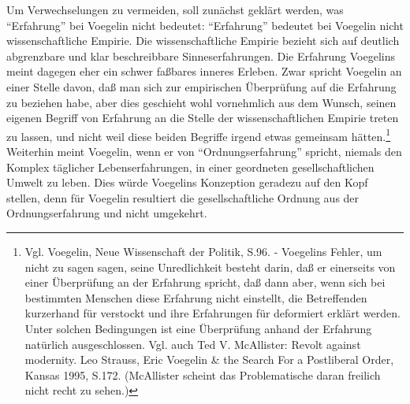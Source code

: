 Um Verwechselungen zu vermeiden, soll zunächst geklärt werden, was
"`Erfahrung"' bei Voegelin nicht bedeutet: "`Erfahrung"' bedeutet bei Voegelin
nicht wissenschaftliche Empirie. Die wissenschaftliche Empirie bezieht sich
auf deutlich abgrenzbare und klar beschreibbare Sinneserfahrungen. Die
Erfahrung Voegelins meint dagegen eher ein schwer faßbares inneres Erleben.
Zwar spricht Voegelin an einer Stelle davon, daß man sich zur empirischen
Überprüfung auf die Erfahrung zu beziehen habe, aber dies geschieht wohl
vornehmlich aus dem Wunsch, seinen eigenen Begriff von Erfahrung an die Stelle
der wissenschaftlichen Empirie treten zu lassen, und nicht weil diese beiden
Begriffe irgend etwas gemeinsam hätten.\footnote{Vgl. Voegelin, Neue
  Wissenschaft der Politik, S.96. - Voegelins Fehler, um nicht zu sagen sagen,
  seine Unredlichkeit besteht darin, daß er einerseits von einer Überprüfung
  an der Erfahrung spricht, daß dann aber, wenn sich bei bestimmten Menschen
  diese Erfahrung nicht einstellt, die Betreffenden kurzerhand für verstockt
  und ihre Erfahrungen für deformiert erklärt werden. Unter solchen Bedingungen
  ist eine Überprüfung anhand der Erfahrung natürlich ausgeschlossen. Vgl.
  auch Ted V. McAllister: Revolt against modernity. Leo Strauss, Eric Voegelin
  \& the Search For a Postliberal Order, Kansas 1995, S.172. (McAllister
  scheint das Problematische daran freilich nicht recht zu sehen.)} Weiterhin
meint Voegelin, wenn er von "`Ordnungserfahrung"' spricht, niemals den Komplex
täglicher Lebenserfahrungen, in einer geordneten gesellschaftlichen Umwelt zu
leben.  Dies würde Voegelins Konzeption geradezu auf den Kopf stellen, denn
für Voegelin resultiert die gesellschaftliche Ordnung aus der
Ordnungserfahrung und nicht umgekehrt.

